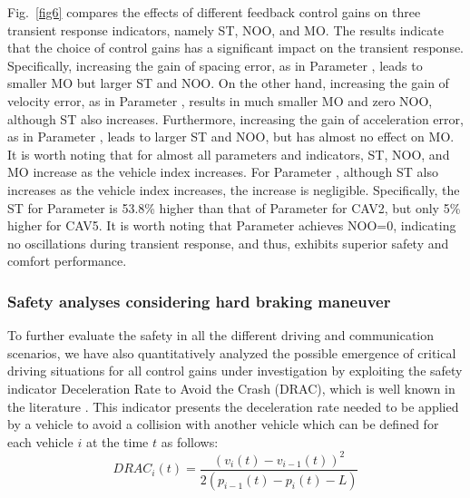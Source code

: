 \documentclass[a4paper]{cas-sc}
\begin{document}
Fig.~\ref{fig6} compares the effects of different feedback control gains on three transient response indicators, namely ST, NOO, and MO. The results indicate that the choice of control gains has a significant impact on the transient response. Specifically, increasing the gain of spacing error, as in Parameter \uppercase\expandafter{}, leads to smaller MO but larger ST and NOO. On the other hand, increasing the gain of velocity error, as in Parameter \uppercase\expandafter{}, results in much smaller MO and zero NOO, although ST also increases. Furthermore, increasing the gain of acceleration error, as in Parameter \uppercase\expandafter{}, leads to larger ST and NOO, but has almost no effect on MO. It is worth noting that for almost all parameters and indicators, ST, NOO, and MO increase as the vehicle index increases. For Parameter \uppercase\expandafter{}, although ST also increases as the vehicle index increases, the increase is negligible. Specifically, the ST for Parameter \uppercase\expandafter{} is 53.8\% higher than that of Parameter \uppercase\expandafter{} for CAV2, but only 5\% higher for CAV5. It is worth noting that Parameter \uppercase\expandafter{} achieves NOO=0, indicating no oscillations during transient response, and thus, exhibits superior safety and comfort performance.




\subsubsection{Safety analyses considering hard braking maneuver}
\label{Section 5.2.2}

To further evaluate the safety in all the different driving and communication scenarios, we have also quantitatively analyzed the possible emergence of critical driving situations for all control gains under investigation by exploiting the safety indicator Deceleration Rate to Avoid the Crash (DRAC), which is well known in the literature \citep{saccomanno2008comparing,fu2021comparison}. This indicator presents the deceleration rate needed to be applied by a vehicle to avoid a collision with another vehicle which can be defined for each vehicle $i$ at the time $t$ as follows:
\begin{equation}
  DRA{C_i}(t) = \frac{{{{\left( {{v_i}(t) - {v_{i - 1}}(t)} \right)}^2}}}{{2\left( {{p_{i - 1}}(t) - {p_i}(t) - L} \right)}}
  \label{eqsafe}
\end{equation}
\end{document}
